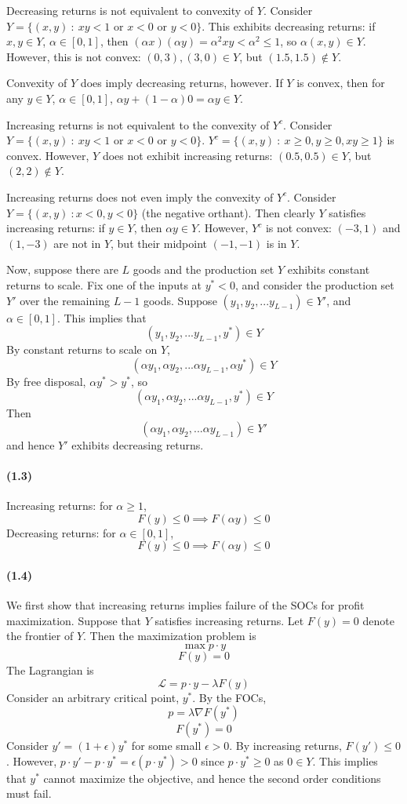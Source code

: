 \documentclass[10pt,letter]{article}
\begin{document}
Decreasing returns is not equivalent to convexity of $Y$. Consider $Y = \{ (x,y) \ : \ xy < 1 \text{ or } x < 0 \text{ or }  y < 0\}$. This exhibits decreasing returns: if $x,y \in Y$, $\alpha \in [0,1]$, then $(\alpha x)(\alpha y) = \alpha^2xy < \alpha^2 \le 1 $, so $\alpha (x,y) \in Y$. However, this is not convex: $(0,3), (3, 0) \in Y$, but $(1.5, 1.5) \not \in Y$.

Convexity of $Y$ does imply decreasing returns, however. If $Y$ is convex, then for any $y \in Y$, $\alpha \in [0,1]$, $\alpha y + (1-\alpha) 0 = \alpha y \in Y$.

Increasing returns is not equivalent to the convexity of $Y^c$. Consider $Y = \{ (x,y) \ : \ xy < 1 \text{ or } x < 0 \text{ or }  y < 0\}$. $Y^c = \{ (x,y) \ : \ x \ge 0, y \ge 0, xy \ge 1\} $ is convex. However, $Y$ does not exhibit increasing returns: $(0.5, 0.5) \in Y$, but $(2,2) \not \in Y$.

Increasing returns does not even imply the convexity of $Y^c$. Consider $Y = \{ (x,y) \ : x < 0, y < 0 \}$ (the negative orthant). Then clearly $Y$ satisfies increasing returns: if $y \in Y$, then $\alpha y \in Y$. However, $Y^c$ is not convex: $(-3, 1)$ and $(1, -3)$ are not in $Y$, but their midpoint $(-1, -1)$ is in $Y$.

Now, suppose there are $L$ goods and the production set $Y$ exhibits constant returns to scale. Fix one of the inputs at $y^* < 0$, and consider the production set $Y'$ over the remaining $L-1$ goods. Suppose $(y_1, y_2, ... y_{L-1}) \in Y'$, and $\alpha \in [0,1]$. This implies that
\[ (y_1, y_2, ... y_{L-1}, y^*) \in Y \]
By constant returns to scale on $Y$,
\[ (\alpha y_1, \alpha y_2, ... \alpha y_{L-1}, \alpha y^*) \in Y \]
By free disposal, $\alpha y^* > y^*$, so
\[ (\alpha y_1, \alpha y_2, ... \alpha y_{L-1}, y^*) \in Y \]
Then
\[ (\alpha y_1, \alpha y_2, ... \alpha y_{L-1}) \in Y' \]
and hence $Y'$ exhibits decreasing returns.
\paragraph{(1.3)}
Increasing returns: for $\alpha \ge 1$,
\[ F(y) \le 0 \implies F(\alpha y) \le 0 \]
Decreasing returns: for $\alpha \in [0,1]$,
\[ F(y) \le 0 \implies F(\alpha y) \le 0 \]
\paragraph{(1.4)}
We first show that increasing returns implies failure of the SOCs for profit maximization. Suppose that $Y$ satisfies increasing returns. Let $F(y)=0$ denote the frontier of $Y$. Then the maximization problem is
\[ \max p \cdot y \]
\[ F(y) = 0 \]
The Lagrangian is
\[ \mathcal{L} = p \cdot y - \lambda F(y) \]
Consider an arbitrary critical point, $y^*$. By the FOCs,
\[ p = \lambda \nabla F(y^*) \]
\[ F(y^*) = 0 \]
Consider $y' = (1+\epsilon)y^*$ for some small $\epsilon > 0$. By increasing returns, $F(y') \le 0$. However, $p \cdot y' - p \cdot y^* = \epsilon ( p \cdot y^*) > 0$ since $p \cdot y^* \ge 0$ as $0 \in Y$. This implies that $y^*$ cannot maximize the objective, and hence the second order conditions must fail.
\end{document}
